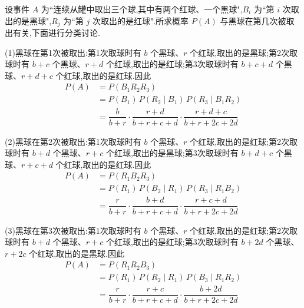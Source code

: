 \begin{solution}
    设事件 $A$ 为``连续从罐中取出三个球,其中有两个红球、一个黑球",$B_i$ 为``第 $i$ 次取出的是黑球",$R_j$ 为``第 $j$ 次取出的是红球".所求概率 $P(A)$ 与黑球在第几次被取出有关,下面进行分类讨论.

    (1)黑球在第1次被取出:第1次取球时有 $b$ 个黑球、$r$ 个红球,取出的是黑球;第2次取球时有 $b+c$ 个黑球、$r+d$ 个红球,取出的是红球;第3次取球时有 $b+c+d$ 个黑球、$r+d+c$ 个红球,取出的是红球.因此
    $$
    \begin{aligned}
        P(A) &= P(B_1 R_2 R_3) \\
        &= P(B_1) \, P(R_2 \mid B_1) \, P(R_3 \mid B_1 R_2) \\
        &= \dfrac{b}{b+r} \cdot \dfrac{r+d}{b+r+c+d} \cdot \dfrac{r+d+c}{b+r+2c+2d}
    \end{aligned}
    $$

    (2)黑球在第2次被取出:第1次取球时有 $b$ 个黑球、$r$ 个红球,取出的是红球;第2次取球时有 $b+d$ 个黑球、$r+c$ 个红球,取出的是黑球;第3次取球时有 $b+d+c$ 个黑球、$r+c+d$ 个红球,取出的是红球.因此
    $$
    \begin{aligned}
        P(A) &= P(R_1 B_2 R_3) \\
        &= P(R_1) \, P(B_2 \mid R_1) \, P(R_3 \mid R_1 B_2) \\
        &= \dfrac{r}{b+r} \cdot \dfrac{b+d}{b+r+c+d} \cdot \dfrac{r+c+d}{b+r+2c+2d}
    \end{aligned}
    $$

    (3)黑球在第3次被取出:第1次取球时有 $b$ 个黑球、$r$ 个红球,取出的是红球;第2次取球时有 $b+d$ 个黑球、$r+c$ 个红球,取出的是红球;第3次取球时有 $b+2d$ 个黑球、$r+2c$ 个红球,取出的是黑球.因此
    $$
    \begin{aligned}
        P(A) &= P(R_1 R_2 B_3) \\
        &= P(R_1) \, P(R_2 \mid R_1) \, P(B_3 \mid R_1 R_2) \\
        &= \dfrac{r}{b+r} \cdot \dfrac{r+c}{b+r+c+d} \cdot \dfrac{b+2d}{b+r+2c+2d}
    \end{aligned}
    $$
\end{solution}

